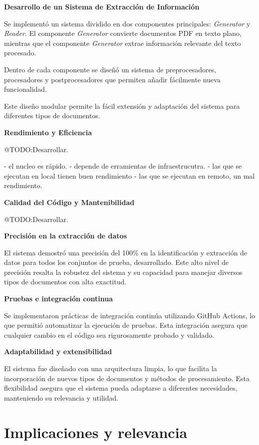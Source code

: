 \textbf{Desarrollo de un Sistema de Extracción de Información}

Se implementó un sistema dividido en dos componentes principales: \textit{Generator} y \textit{Reader}.
El componente \textit{Generator} convierte documentos PDF en texto plano, mientras que el componente \textit{Generator}
extrae información relevante del texto procesado.

Dentro de cada componente se diseñó un sistema de preprocesadores, procesadores y postprocesadores que permiten
añadir fácilmente nueva funcionalidad.

Este diseño modular permite la fácil extensión y adaptación del sistema para diferentes tipos de documentos.

\textbf {Rendimiento y Eficiencia}

\colorbox{color_highlight}{@TODO:Desarrollar.}

- el nucleo es rápido.
- depende de erramientas de infraestrucutra.
- las que se ejecutan en local tienen buen rendimiento
- las que se ejecutan en remoto, un mal rendimiento.

\textbf {Calidad del Código y Mantenibilidad}

\colorbox{color_highlight}{@TODO:Desarrollar.}


\textbf {Precisión en la extracción de datos}

El sistema demostró una precisión del 100\% en la identificación y extracción de datos para todos los conjuntos de
prueba, desarrollado.
Este alto nivel de precisión resalta la robustez del sistema y su capacidad para manejar diversos tipos de documentos
con alta exactitud.

\textbf {Pruebas e integración continua}

Se implementaron prácticas de integración continúa utilizando GitHub Actions, lo que permitió automatizar la ejecución
de pruebas.
Esta integración asegura que cualquier cambio en el código sea rigurosamente probado y validado.

\textbf {Adaptabilidad y extensibilidad}

El sistema fue diseñado con una arquitectura limpia, lo que facilita la incorporación de nuevos tipos de documentos y
métodos de procesamiento.
Esta flexibilidad asegura que el sistema pueda adaptarse a diferentes necesidades, manteniendo su relevancia y utilidad.


\section{Implicaciones y relevancia}

